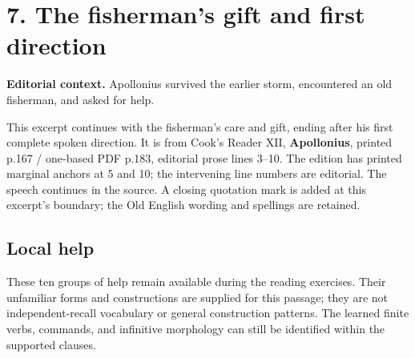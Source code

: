 \section*{7. The fisherman’s gift and first direction}

\textbf{Editorial context.} Apollonius survived the earlier storm, encountered an old fisherman, and asked for help.

This excerpt continues with the fisherman’s care and gift, ending after his first complete spoken direction. It is from Cook’s Reader XII, \textbf{Apollonius}, printed p.167 /\allowbreak{} one-based PDF p.183, editorial prose lines 3–10. The edition has printed marginal anchors at 5 and 10; the intervening line numbers are editorial. The speech continues in the source. A closing quotation mark is added at this excerpt’s boundary; the Old English wording and spellings are retained.

\par\begin{minipage}{\linewidth}\raggedright
{}
\end{minipage}\par

\subsection*{Local help}

These ten groups of help remain available during the reading exercises. Their unfamiliar forms and constructions are supplied for this passage; they are not independent-recall vocabulary or general construction patterns. The learned finite verbs, commands, and infinitive morphology can still be identified within the supported clauses.

